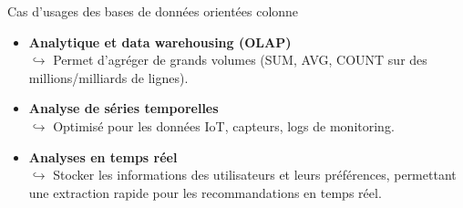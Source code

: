 \begin{frame}{Cas d'usages des bases de données orientées colonne}

    \begin{itemize}
        \item \textbf{Analytique et data warehousing (OLAP)}\\
              $\hookrightarrow$ Permet d'agréger de grands volumes (SUM, AVG,
              COUNT sur des millions/milliards de lignes).
              \vspace{0.3cm}

        \item \textbf{Analyse de séries temporelles}\\
              $\hookrightarrow$ Optimisé pour les données IoT, capteurs, logs de
              monitoring.
              \vspace{0.3cm}

        \item \textbf{Analyses en temps réel}\\
              $\hookrightarrow$ Stocker les informations des utilisateurs et
              leurs préférences, permettant une extraction rapide pour les
              recommandations en temps réel.
    \end{itemize}

\end{frame}

